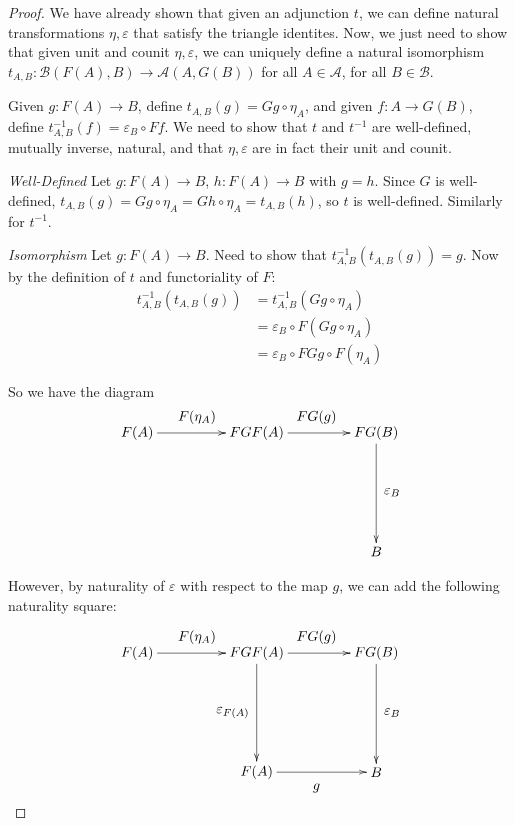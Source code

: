 \documentclass[11pt]{article}
\theoremstyle{definition}
\theoremstyle{definition}
\theoremstyle{plain}
\theoremstyle{plain}
\theoremstyle{plain}
\begin{document}
\begin{proof}
We have already shown that given an adjunction $t$, we can define natural transformations $\eta, \varepsilon$ that satisfy the triangle identites. Now, we just need to show that given unit and counit $\eta, \varepsilon$, we can uniquely define a natural isomorphism $t_{A,B}:\mathscr{B}(F(A),B) \to \mathscr{A}(A,G(B))$ for all $A \in \mathscr{A}$, for all $B \in \mathscr{B}$.

Given $g:F(A) \to B$, define $t_{A,B}(g)=Gg \circ \eta_{A}$, and given $f: A \to G(B)$, define $t^{-1}_{A,B}(f)=\varepsilon_{B} \circ Ff$. We need to show that $t$ and $t^{-1}$ are well-defined, mutually inverse, natural, and that $\eta, \varepsilon$ are in fact their unit and counit.

\emph{Well-Defined}
Let $g:F(A) \to B$, $h: F(A) \to B$ with $g = h$. Since $G$ is well-defined, $t_{A,B}(g)=Gg \circ \eta_{A} = Gh \circ \eta_{A} = t_{A,B}(h)$, so $t$ is well-defined. Similarly for $t^{-1}$.

\emph{Isomorphism}
Let $g:F(A) \to B$. Need to show that $t^{-1}_{A,B}(t_{A,B}(g)) = g$. Now by the definition of $t$ and functoriality of $F$:
\begin{align*}
t^{-1}_{A,B}(t_{A,B}(g)) 	&= t^{-1}_{A,B}(Gg \circ \eta_{A}) \\
					&=\varepsilon_{B} \circ F(Gg \circ \eta_{A}) \\
					&=\varepsilon_{B} \circ FGg \circ F(\eta_{A})
\end{align*}

So we have the diagram
\begin{equation*}
\begin{xy}
(0,0)*+{F(A)}="1"; (30,0)*+{FGF(A)}="2"; (60,0)*+{FG(B)}="3"; (60,-30)*+{B}="4";
{\ar "1";"2"}?*!/_4mm/{F(\eta_{A})};
{\ar "2";"3"}?*!/_4mm/{FG(g)};
{\ar "3";"4"}?*!/_4mm/{\varepsilon_{B}};
\end{xy}
\end{equation*}

However, by naturality of $\varepsilon$ with respect to the map $g$, we can add the following naturality square:

\begin{equation*}
\begin{xy}
(0,0)*+{F(A)}="1"; (30,0)*+{FGF(A)}="2"; (60,0)*+{FG(B)}="3"; (60,-30)*+{B}="4";
(30,-30)*+{F(A)}="5";
{\ar "1";"2"}?*!/_4mm/{F(\eta_{A})};
{\ar "2";"3"}?*!/_4mm/{FG(g)};
{\ar "3";"4"}?*!/_4mm/{\varepsilon_{B}};
{\ar "2";"5"}?*!/^6mm/{\varepsilon_{F(A)}};
{\ar "5";"4"};?*!/^4mm/{g};
\end{xy}
\end{equation*}


\end{proof}
\end{document}
